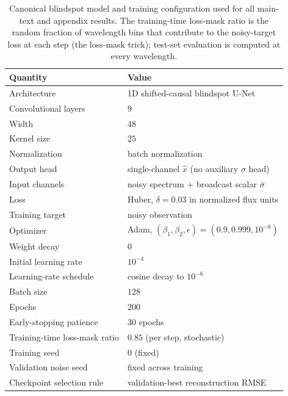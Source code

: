 \documentclass[twocolumn]{aastex7}
\begin{document}
\begin{table}[ht]
\centering
\small
\caption{Canonical blindspot model and training configuration used for all main-text and appendix results. The training-time loss-mask ratio is the random fraction of wavelength bins that contribute to the noisy-target loss at each step (the loss-mask trick); test-set evaluation is computed at every wavelength.}
\label{tab:training_config}
\begin{tabular}{ll}
\hline
\textbf{Quantity} & \textbf{Value} \\
\hline
Architecture & 1D shifted-causal blindspot U-Net \\
Convolutional layers & $9$ \\
Width & $48$ \\
Kernel size & $25$ \\
Normalization & batch normalization \\
Output head & single-channel $\hat{x}$ (no auxiliary $\sigma$ head) \\
Input channels & noisy spectrum + broadcast scalar $\bar{\sigma}$ \\
Loss & Huber, $\delta=0.03$ in normalized flux units \\
Training target & noisy observation \\
Optimizer & Adam, $(\beta_1,\beta_2,\epsilon)=(0.9,0.999,10^{-8})$ \\
Weight decay & $0$ \\
Initial learning rate & $10^{-4}$ \\
Learning-rate schedule & cosine decay to $10^{-6}$ \\
Batch size & $128$ \\
Epochs & $200$ \\
Early-stopping patience & $30$ epochs \\
Training-time loss-mask ratio & $0.85$ (per step, stochastic) \\
Training seed & $0$ (fixed) \\
Validation noise seed & fixed across training \\
Checkpoint selection rule & validation-best reconstruction RMSE \\
\hline
\end{tabular}
\end{table}
\end{document}
